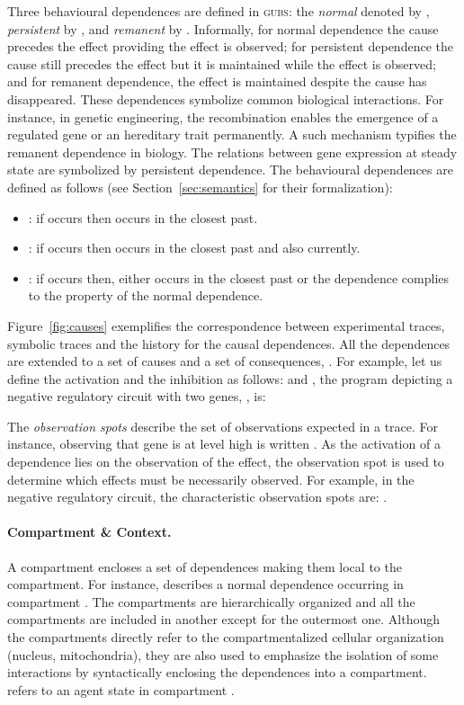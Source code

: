 \documentclass{eptcs}
\newcommand{\ie}[0]{\abbrev{\textit{i.e.}}}
\newcommand{\eg}[0]{\abbrev{\textit{e.g.}}}
\newcounter{ti}
\begin{document}
Three behavioural dependences are defined in \textsc{gubs}: the \emph{normal} denoted by , \emph{persistent} by , and \emph{remanent} by . Informally, for normal dependence the cause precedes the effect providing the effect is observed; for persistent dependence the cause still precedes the effect but it is maintained while the effect is observed; and for remanent dependence, the effect is maintained despite the cause has disappeared. These dependences symbolize common biological interactions. For instance,
in genetic engineering, the recombination enables the emergence of a regulated gene or an hereditary trait permanently. A such mechanism typifies the remanent dependence in biology. The relations between gene expression at steady state are symbolized by persistent dependence. The behavioural dependences are defined as follows (see Section~\ref{sec:semantics} for their formalization): 
\begin{itemize}
\item : if  occurs then  occurs in the closest past.
\item : if  occurs then  occurs in the closest past and also currently.
\item : if  occurs then, either  occurs in the closest past or the dependence complies to the property of the normal dependence.
\end{itemize}
Figure~\ref{fig:causes} exemplifies the correspondence between experimental traces, symbolic traces and the history for the causal dependences. 
 All the dependences are extended to a set of causes and a set of consequences, \ie . 
For example, let us define the activation and the inhibition as follows:
 and , 
the program depicting a negative regulatory circuit with two genes, \ie , is:


The \emph{observation spots} describe the set of observations expected in a trace. For instance, observing that gene  is at level high is written . As the activation of a dependence lies on the observation of the effect, the observation spot is used to determine which effects must be necessarily observed. For example, in the negative regulatory circuit, the characteristic observation spots are: .

\paragraph{Compartment \& Context.} A compartment encloses a set of dependences making them local to the compartment. For instance,  describes a normal dependence occurring in compartment . The compartments are hierarchically organized and all the compartments are included in another except for the outermost one.
Although the compartments directly refer to the compartmentalized cellular organization (\eg nucleus, mitochondria), they are also used to emphasize the isolation of some interactions by syntactically enclosing the dependences into a compartment.  refers to an agent state in compartment . 
\end{document}

